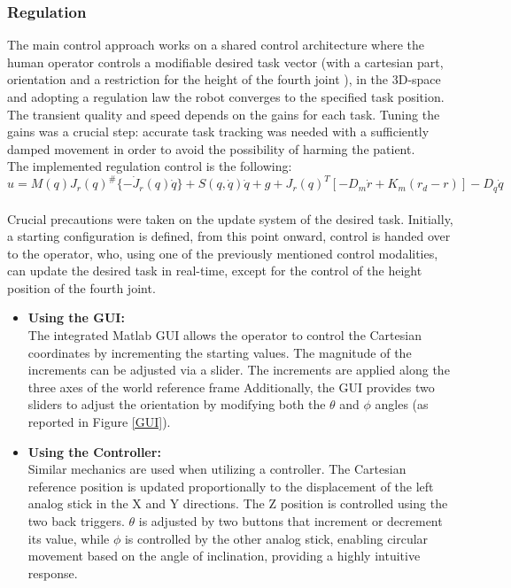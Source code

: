 \documentclass{article}
\begin{document}
\subsubsection{Regulation}
The main control approach works on a shared control architecture where the human operator controls a modifiable desired task vector (with a cartesian part, orientation and a restriction for the height of the fourth joint ), in the 3D-space and adopting a regulation law the robot converges to the specified task position. The transient quality and speed depends on the gains  for each task. Tuning the gains was a crucial step: accurate task tracking was needed with a sufficiently damped movement in order to avoid the possibility of harming the patient.
\\The implemented regulation control is the following:
$$u=M(q)J_{r}(q)^{\#}\{-\dot{J}_{r}(q)\dot{q}\}+S(q,\dot{q})\dot{q}+g+J_{r}(q)^{T}[-D_{m}\dot{r}+K_{m}(r_{d}-r)]-D_{q}\dot{q}$$
\\
Crucial precautions were taken on the update system of the desired task. Initially, a starting configuration is defined, from this point onward, control is handed over to the operator, who, using one of the previously mentioned control modalities, can update the desired task in real-time, except for the control of the height position of the fourth joint.
\newline
\begin{itemize}
\item{\textbf{Using the GUI:}} 
\\The integrated Matlab GUI allows the operator to control the Cartesian coordinates by incrementing the starting values. The magnitude of the increments can be adjusted via a slider. The increments are applied along the three axes of the world reference frame Additionally, the GUI provides two sliders to adjust the orientation by modifying both the $\theta$ and $\phi$ angles (as reported in Figure \ref{GUI}).
\item{\textbf{Using the Controller:}} 
\\Similar mechanics are used when utilizing a controller. The Cartesian reference position is updated proportionally to the displacement of the left analog stick in the X and Y directions. The Z position is controlled using  the two back triggers. $\theta$ is adjusted by two buttons that increment or decrement its value, while $\phi$ is controlled by the other analog stick, enabling circular movement based on the angle of inclination, providing a highly intuitive response.
\end{itemize}
\newpage
\end{document}
